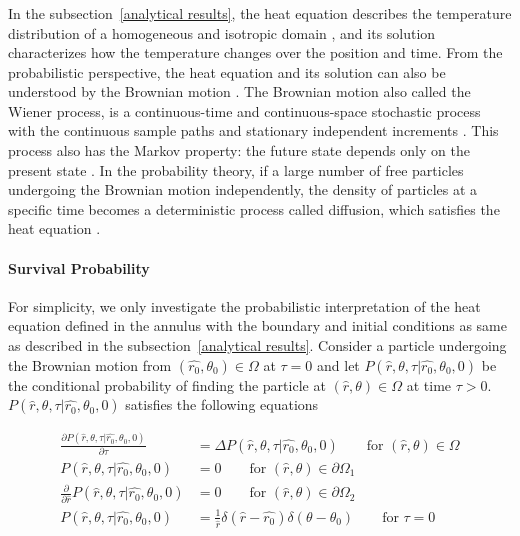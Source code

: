 \subsubsection{}\label{probabilistic interpretation}

In the subsection~\ref{analytical results}, the heat equation
describes the temperature distribution of a homogeneous and isotropic
domain \cite{varadhan1980lectures}, and its solution characterizes how
the temperature changes over the position and time. From the
probabilistic perspective, the heat equation and its solution can also
be understood by the Brownian
motion \cite{brown1828microscopical}. The Brownian motion also called
the Wiener process, is a continuous-time and continuous-space
stochastic process \cite{karlin2014first} with the continuous sample
paths and stationary independent
increments \cite{ito2012diffusion}. This process also has the Markov
property: the future state depends only on the present
state \cite{bharucha2012elements}. In the probability theory, if a
large number of free particles undergoing the Brownian motion
independently, the density of particles at a specific time becomes a
deterministic process called diffusion, which satisfies the heat
equation \cite{kac1947random}\cite{varadhan1980lectures}.



\paragraph{Survival Probability}


\newcommand{\prob}{P(\hat r, \theta, \tau | \hat{r_0}, \theta_0, 0)}
                                 

For simplicity, we only investigate the probabilistic interpretation
of the heat equation defined in the annulus with the boundary and
initial conditions as same as described in the
subsection~\ref{analytical results}. Consider a particle undergoing
the Brownian motion from $(\hat{r_0}, \theta_0) \in \Omega$ at
$\tau=0$ and let $\prob$ be the conditional probability of finding the
particle at $(\hat r, \theta) \in \Omega$ at time $\tau>0$. $\prob$
satisfies the following equations

\begin{align}
  \frac{\partial \prob}{\partial \tau} &= \Delta \prob
  \qquad\text{for $(\hat r, \theta) \in \Omega$}\label{eq:polar_coordinate_diffusion_conditional_prob} \\
  \prob & = 0
  \qquad\text{for $(\hat r, \theta) \in \partial \Omega_1$}\label{eq:Dirichlet_bc_conditional_prob} \\
  \frac{\partial}{\partial \hat r} \prob &= 0 
  \qquad\text{for $(\hat r, \theta) \in \partial \Omega_2$}\label{eq:Neumann_bc_conditional_prob} \\
  \prob & = \frac{1}{\hat r}\delta(\hat r - \hat{r_0}) \delta(\theta - \theta_0)
  \qquad\text{for $\tau = 0$}\label{eq:initial_cd_conditional_prob}
\end{align}

